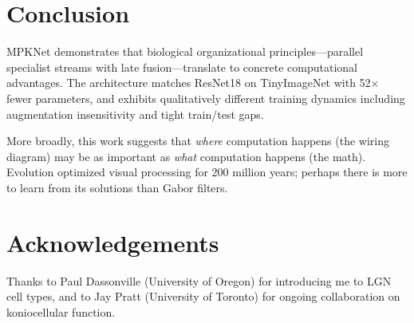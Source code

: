 \documentclass[11pt]{article}
\begin{document}
\section{Conclusion}

MPKNet demonstrates that biological organizational principles---parallel specialist streams with late fusion---translate to concrete computational advantages. The architecture matches ResNet18 on TinyImageNet with 52$\times$ fewer parameters, and exhibits qualitatively different training dynamics including augmentation insensitivity and tight train/test gaps.

More broadly, this work suggests that \textit{where} computation happens (the wiring diagram) may be as important as \textit{what} computation happens (the math). Evolution optimized visual processing for 200 million years; perhaps there is more to learn from its solutions than Gabor filters.

\section*{Acknowledgements}

Thanks to Paul Dassonville (University of Oregon) for introducing me to LGN cell types, and to Jay Pratt (University of Toronto) for ongoing collaboration on koniocellular function.
\end{document}
